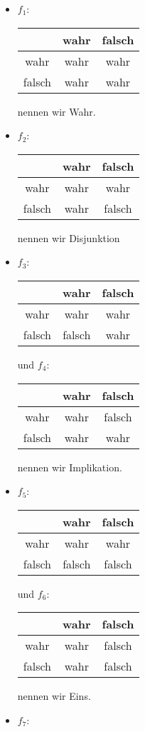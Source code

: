 \begin{solution}
\phantom{}
\begin{itemize}
  \item $f_1$:\quad\begin{tabular}{|c|c|c|}
\hline
 & wahr & falsch \\
\hline
wahr & wahr & wahr \\
\hline
falsch & wahr & wahr \\
\hline
\end{tabular} nennen wir Wahr.
  \item $f_2$:\quad\begin{tabular}{|c|c|c|}
\hline
& wahr & falsch \\
\hline
wahr & wahr & wahr \\
\hline
falsch & wahr & falsch \\
\hline
\end{tabular} nennen wir Disjunktion
\item $f_3$:\quad\begin{tabular}{|c|c|c|}
\hline
& wahr & falsch \\
\hline
wahr & wahr & wahr \\
\hline
falsch & falsch & wahr \\
\hline
\end{tabular} und
$f_4$:\quad\begin{tabular}{|c|c|c|}
\hline
& wahr & falsch \\
\hline
wahr & wahr & falsch \\
\hline
falsch & wahr & wahr \\
\hline
\end{tabular}
nennen wir Implikation.
\item $f_5$:\quad\begin{tabular}{|c|c|c|}
\hline
& wahr & falsch \\
\hline
wahr & wahr & wahr \\
\hline
falsch & falsch & falsch \\
\hline
\end{tabular} und
$f_6$:\quad\begin{tabular}{|c|c|c|}
\hline
& wahr & falsch \\
\hline
wahr & wahr & falsch \\
\hline
falsch & wahr & falsch\\
\hline
\end{tabular} nennen wir Eins.
\item
$f_7$:\quad\begin{tabular}{|c|c|c|}
\hline

\end{tabular}
\end{itemize}
\end{solution}
